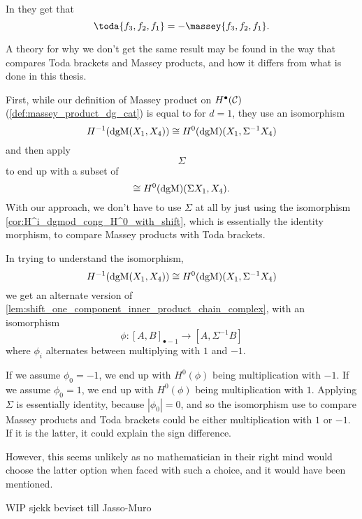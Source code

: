 \begin{remark}
    In \cite[Theorem 4.2.6]{Jasso-Muro_2023} they get that
    \[
        \toda{f_3, f_2, f_1} = -\massey{f_3, f_2, f_1}.
    \]

    A theory for why we don't get the same result may be found in the way that \cite{Jasso-Muro_2023} compares Toda brackets and Massey products, and how it differs from what is done in this thesis.

    First, while our definition of Massey product on \( H^{\bullet}({\mathcal{C}}) \) (\autoref{def:massey_product_dg_cat}) is equal to \cite[Definition 4.2.1]{Jasso-Muro_2023} for \( d = 1 \), they use an isomorphism
    \[
        H^{-1}(\operatorname{dgM}(X_1, X_4)) \cong H^0(\operatorname{dgM})(X_1, \Sigma^{-1} X_4)
    \]
    and then apply
    \[
        \Sigma
    \]
    to end up with a subset of
    \[
        \cong H^0(\operatorname{dgM})(\Sigma X_1, X_4).
    \]
    With our approach, we don't have to use \( \Sigma \) at all by just using the isomorphism \autoref{cor:H^i_dgmod_cong_H^0_with_shift}, which is essentially the identity morphism, to compare Massey products with Toda brackets.

    In trying to understand the isomorphism,
    \[
        H^{-1}(\operatorname{dgM}(X_1, X_4)) \cong H^0(\operatorname{dgM})(X_1, \Sigma^{-1} X_4)
    \]
    we get an alternate version of \autoref{lem:shift_one_component_inner_product_chain_complex}, with an isomorphism
    \[
        \phi: [A, B]_{\bullet - 1} \to [A, \Sigma^{-1} B]
    \]
    where \( \phi_i \) alternates between multiplying with \( 1 \) and \( -1 \).

    If we assume \( \phi_0 = -1 \), we end up with \( H^0(\phi) \) being multiplication with \( -1 \). If we assume \( \phi_0 = 1 \), we end up with \( H^0(\phi) \) being multiplication with \( 1 \). Applying \( \Sigma \) is essentially identity, because \( |\phi_0| = 0 \), and so the isomorphism \cite{Jasso-Muro_2023} use to compare Massey products and Toda brackets could be either multiplication with \( 1 \) or \( -1 \). If it is the latter, it could explain the sign difference.

    However, this seems unlikely as no mathematician in their right mind would choose the latter option when faced with such a choice, and it would have been mentioned.

    WIP sjekk beviset till Jasso-Muro
\end{remark}